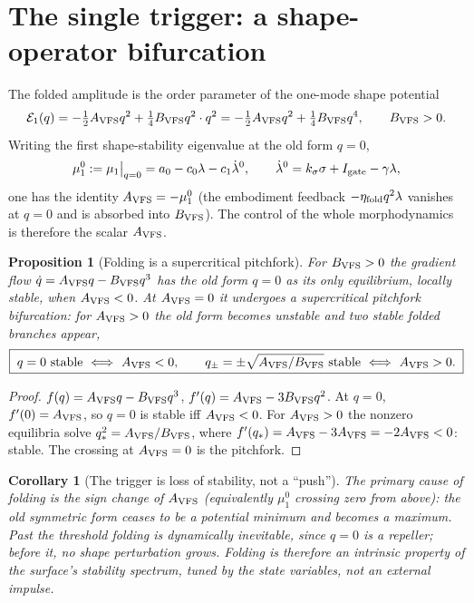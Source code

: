 \documentclass[11pt,a4paper,oneside]{book}
\newcommand{\Igate}{I_{\rm gate}}
\newcommand{\Avfs}{A_{\rm VFS}}
\newcommand{\Bvfs}{B_{\rm VFS}}
\newcommand{\etaf}{\eta_{\rm fold}}
\theoremstyle{plain}
\newtheorem{proposition}{Proposition}[chapter]
\newtheorem{corollary}{Corollary}[chapter]
\theoremstyle{definition}
\theoremstyle{remark}
\begin{document}
\section{The single trigger: a shape-operator bifurcation}\label{foldingtrigger:sec:bif}

The folded amplitude is the order parameter of the one-mode shape potential
\begin{equation}
\mathcal E_1(q)=-\tfrac12\Avfs q^2+\tfrac14\Bvfs q^2\cdot q^2
=-\tfrac12\Avfs q^2+\tfrac14\Bvfs q^4,\qquad \Bvfs>0.
\end{equation}
Writing the first shape-stability eigenvalue at the old form $q=0$,
\begin{equation}
\mu_1^{0}:=\mu_1\big|_{q=0}=a_0-c_0\lambda-c_1\dot\lambda^{0},
\qquad
\dot\lambda^{0}=k_\sigma\sigma+\Igate-\gamma\lambda,
\end{equation}
one has the identity $\Avfs=-\mu_1^{0}$ (the embodiment feedback $-\etaf q^2\lambda$ vanishes at $q=0$ and is
absorbed into $\Bvfs$). The control of the whole morphodynamics is therefore the scalar $\Avfs$.

\begin{proposition}[Folding is a supercritical pitchfork]\label{foldingtrigger:prop:pitchfork}
For $\Bvfs>0$ the gradient flow $\dot q=\Avfs q-\Bvfs q^3$ has the old form $q=0$ as its only equilibrium,
locally stable, when $\Avfs<0$. At $\Avfs=0$ it undergoes a supercritical pitchfork bifurcation: for
$\Avfs>0$ the old form becomes unstable and two stable folded branches appear,
\begin{equation}
\boxed{\;q=0\ \text{stable}\ \Longleftrightarrow\ \Avfs<0,
\qquad
q_\pm=\pm\sqrt{\Avfs/\Bvfs}\ \text{stable}\ \Longleftrightarrow\ \Avfs>0.\;}
\end{equation}
\end{proposition}
\begin{proof}
$f(q)=\Avfs q-\Bvfs q^3$, $f'(q)=\Avfs-3\Bvfs q^2$. At $q=0$, $f'(0)=\Avfs$, so $q=0$ is stable iff
$\Avfs<0$. For $\Avfs>0$ the nonzero equilibria solve $q_\ast^2=\Avfs/\Bvfs$, where
$f'(q_\ast)=\Avfs-3\Avfs=-2\Avfs<0$: stable. The crossing at $\Avfs=0$ is the pitchfork.
\end{proof}

\begin{corollary}[The trigger is loss of stability, not a ``push'']\label{foldingtrigger:cor:loss}
The primary cause of folding is the sign change of $\Avfs$ (equivalently $\mu_1^{0}$ crossing zero from
above): the old symmetric form ceases to be a potential minimum and becomes a maximum. Past the threshold
folding is dynamically inevitable, since $q=0$ is a repeller; before it, no shape perturbation grows.
Folding is therefore an intrinsic property of the surface's stability spectrum, tuned by the state
variables, not an external impulse.
\end{corollary}
\end{document}

